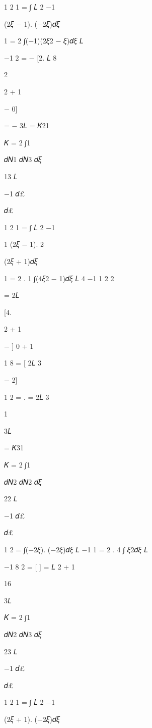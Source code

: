 {{{{{ 
1
2	1
=   ∫  
𝐿	2
−1
 

(2𝜉 − 1). (−2𝜉)𝑑𝜉
 
1
= 2 ∫(−1)(2𝜉2 − 𝜉)𝑑𝜉
𝐿
 
−1
2
= −   [2.
𝐿
8
 

2

 
2 + 1
 

− 0]
 
= − 3𝐿 = 𝐾21


 
𝐾	= 2 ∫1
 
𝑑𝑁1 𝑑𝑁3 𝑑𝜉
 
13	𝐿
 
−1 𝑑£
 
 
𝑑£
 

 
1
2	1
=   ∫  
𝐿	2
−1
 
1
(2𝜉 − 1).  
2
 

(2𝜉 + 1)𝑑𝜉
 
1
= 2 . 1 ∫(4𝜉2 − 1)𝑑𝜉
𝐿 4
−1
1	2	2
 
=
2𝐿
 
[4.
 

 
2 + 1
 
−	]
0 + 1
 
1  8
=	[ 
2𝐿 3
 
− 2]
 

 
1  2
=	.   =
2𝐿 3
 
1

 
3𝐿
 
= 𝐾31
 


 
𝐾	= 2 ∫1
 
𝑑𝑁2 𝑑𝑁2 𝑑𝜉
 
22	𝐿
 
−1 𝑑£
 
 
𝑑£
 

1
2
=   ∫(−2𝜉). (−2𝜉)𝑑𝜉
𝐿
−1
1
= 2 . 4 ∫ 𝜉2𝑑𝜉
𝐿
 
−1
8	2
=   [	] =
𝐿 2 + 1
 

16

 
3𝐿
 


 
𝐾	= 2 ∫1
 
𝑑𝑁2 𝑑𝑁3 𝑑𝜉
 
23	𝐿
 
−1 𝑑£
 
 
𝑑£
 

 
1
2	1
=   ∫  
𝐿	2
−1
 

(2𝜉 + 1). (−2𝜉)𝑑𝜉
 
}}}}}
